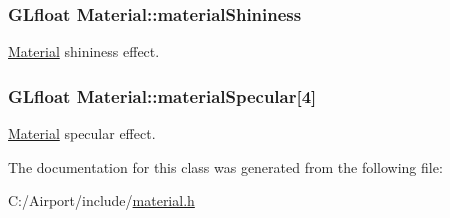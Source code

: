 \subsubsection[{\texorpdfstring{material\+Shininess}{materialShininess}}]{\setlength{\rightskip}{0pt plus 5cm}G\+Lfloat Material\+::material\+Shininess\hspace{0.3cm}{\ttfamily [private]}}\hypertarget{class_material_aeb155ecd278b3ea891077ff8aea8cd93}{}\label{class_material_aeb155ecd278b3ea891077ff8aea8cd93}
\hyperlink{class_material}{Material} shininess effect. 
\subsubsection[{\texorpdfstring{material\+Specular}{materialSpecular}}]{\setlength{\rightskip}{0pt plus 5cm}G\+Lfloat Material\+::material\+Specular\mbox{[}4\mbox{]}\hspace{0.3cm}{\ttfamily [private]}}\hypertarget{class_material_ad3daaf8271e92ef553f08edf0878f725}{}\label{class_material_ad3daaf8271e92ef553f08edf0878f725}
\hyperlink{class_material}{Material} specular effect. 

The documentation for this class was generated from the following file\+:\begin{DoxyCompactItemize}
\item 
C\+:/\+Airport/include/\hyperlink{material_8h}{material.\+h}\end{DoxyCompactItemize}
